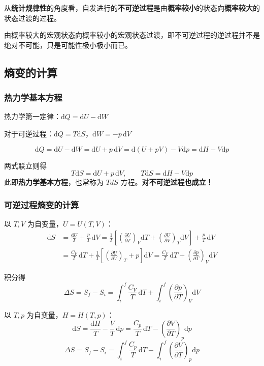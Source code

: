 \documentclass[UTF8]{ctexart}
\begin{document}
从\textbf{统计规律性}的角度看，自发进行的\textbf{不可逆过程}是由\textbf{概率较小}的状态向\textbf{概率较大}的状态过渡的过程。

由概率较大的宏观状态向概率较小的宏观状态过渡，即不可逆过程的逆过程并不是绝对不可能，只是可能性极小极小而已。

\subsection{熵变的计算}

\subsubsection{热力学基本方程}

热力学第一定律：$\mathrm{d}Q=\mathrm{d}U-\mathrm{d}W$

对于可逆过程：$\mathrm{d}Q=T\mathrm{d}S$，$\mathrm{d}W=-p\,\mathrm{d}V$

\[
\mathrm{d}Q=\mathrm{d}U-\mathrm{d}W=\mathrm{d}U+p\,\mathrm{d}V
=\mathrm{d}(U+pV)-V\mathrm{d}p=\mathrm{d}H-V\mathrm{d}p
\]

两式联立则得
\[
\boxed{T\mathrm{d}S=\mathrm{d}U+p\,\mathrm{d}V},\qquad
\boxed{T\mathrm{d}S=\mathrm{d}H-V\mathrm{d}p}
\]
此即\textbf{热力学基本方程}，也常称为 $TdS$ 方程。\textbf{对不可逆过程也成立！}

\subsubsection{可逆过程熵变的计算}

以 $T,V$ 为自变量，$U=U(T,V)$：
\begin{align*}
\mathrm{d}S&=\frac{\mathrm{d}U}{T}+\frac{p}{T}\,\mathrm{d}V
=\frac{1}{T}\!\left[\left(\frac{\partial U}{\partial T}\right)_V\mathrm{d}T
+\left(\frac{\partial U}{\partial V}\right)_T\mathrm{d}V\right]
+\frac{p}{T}\,\mathrm{d}V\\[4pt]
&=\frac{C_V}{T}\,\mathrm{d}T+\frac{1}{T}\!\left[\left(\frac{\partial U}{\partial V}\right)_T+p\right]\mathrm{d}V
=\frac{C_V}{T}\,\mathrm{d}T+\left(\frac{\partial p}{\partial T}\right)_V\mathrm{d}V
\end{align*}

积分得
\[
\Delta S=S_f-S_i=\int_i^f\frac{C_V}{T}\,\mathrm{d}T
+\int_i^f\left(\frac{\partial p}{\partial T}\right)_V\mathrm{d}V
\]

以 $T,p$ 为自变量，$H=H(T,p)$：
\[
\mathrm{d}S=\frac{\mathrm{d}H}{T}-\frac{V}{T}\,\mathrm{d}p
=\frac{C_p}{T}\,\mathrm{d}T-\left(\frac{\partial V}{\partial T}\right)_p\mathrm{d}p
\]
\[
\Delta S=S_f-S_i=\int_i^f\frac{C_p}{T}\,\mathrm{d}T
-\int_i^f\left(\frac{\partial V}{\partial T}\right)_p\mathrm{d}p
\]
\end{document}
